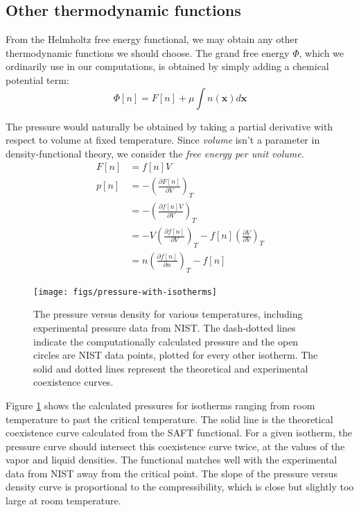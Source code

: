 \documentclass[letterpaper,twocolumn,amsmath,amssymb,prb]{revtex4-1}
\newcommand{\xx}{\textbf{x}}
\begin{document}
\subsection{Other thermodynamic functions}

From the Helmholtz free energy functional, we may obtain any other
thermodynamic functions we should choose.  The grand free energy
$\Phi$, which we ordinarily use in our computations, is obtained by
simply adding a chemical potential term:
\begin{equation}
  \Phi[n] = F[n] + \mu \int n(\xx) d\xx
\end{equation}

The pressure would naturally be obtained by taking a partial
derivative with respect to volume at fixed temperature.  Since
\emph{volume} isn't a parameter in density-functional theory, we
consider the \emph{free energy per unit volume}.
\begin{align}
  F[n] &= f[n]V \\
  p[n] &= -\left(\frac{\partial F[n]}{\partial V}\right)_{T} \\
  &= -\left(\frac{\partial f[n]V}{\partial V}\right)_{T} \\
  &= -V\left(\frac{\partial f[n]}{\partial V}\right)_{T}
   - f[n]\left(\frac{\partial V}{\partial V}\right)_{T} \\
  &= n \left(\frac{\partial f[n]}{\partial n}\right)_{T} - f[n]
\end{align}

\begin{figure}
\begin{center}
\texttt{[image: figs/pressure-with-isotherms]}
\end{center}
\caption{The pressure versus density for various temperatures, including
experimental pressure data from NIST\cite{nistwater}. The dash-dotted lines
indicate the computationally calculated pressure and the open circles are 
NIST data points, plotted for every other isotherm. The solid and dotted lines
represent the theoretical and experimental coexistence curves.}
\label{fig:pressure-with-isotherms}
\end{figure}

Figure \ref{fig:pressure-with-isotherms} shows the calculated pressures for
isotherms ranging from room temperature to past the critical temperature. The
solid line is the theoretical coexistence curve calculated from the SAFT
functional. For a given isotherm, the pressure curve should intersect this
coexistence curve twice, at the values of the vapor and liquid densities. The
functional matches well with the experimental data from NIST away from the
critical point. The slope of the pressure versus density curve is proportional
to the compressibility, which is close but slightly too large at room
temperature. 
\end{document}
